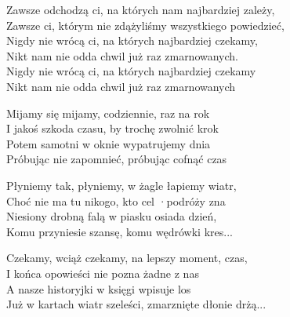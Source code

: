 \begin{text}
    \small{
    Zawsze odchodzą ci, na których nam najbardziej zależy,\\
    Zawsze ci, którym nie zdążyliśmy wszystkiego powiedzieć,\\
    Nigdy nie wrócą ci, na których najbardziej czekamy,\\
    Nikt nam nie odda chwil już raz zmarnowanych.\\
    Nigdy nie wrócą ci, na których najbardziej czekamy\\
    Nikt nam nie odda chwil już raz zmarnowanych

    Mijamy się mijamy, codziennie, raz na rok\\
    I jakoś szkoda czasu, by trochę zwolnić krok\\
    Potem samotni w oknie wypatrujemy dnia\\
    Próbując nie zapomnieć, próbując cofnąć czas

    Płyniemy tak, płyniemy, w żagle łapiemy wiatr,\\
    Choć nie ma tu nikogo, kto cel ·podróży zna\\
    Niesiony drobną falą w piasku osiada dzień,\\
    Komu przyniesie szansę, komu wędrówki kres...

    Czekamy, wciąż czekamy, na lepszy moment, czas,\\
    I końca opowieści nie pozna żadne z nas\\
    A nasze historyjki w księgi wpisuje los\\
    Już w kartach wiatr szeleści, zmarznięte dłonie drżą...
    }
\end{text}
\begin{chord}

\end{chord}